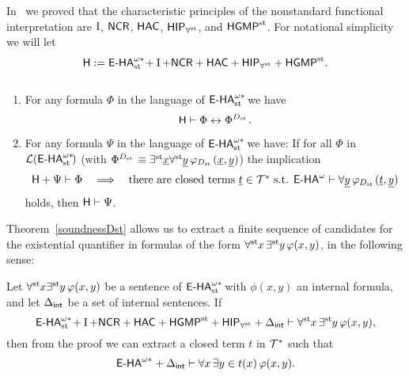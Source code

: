 In~\cite{BBS12} we proved that the characteristic principles of the nonstandard functional interpretation are $\I$, $\NCR$, $\HAC$, $\HIP_{\forallst}$, and $\HGMP$. For notational simplicity we will let
\[
     \HH := \ehaststar + \I + \NCR + \HAC + \HIP_{\forallst} + \HGMP.
\]
\begin{thm} $\, $

\begin{enumerate}

\item For any formula $\Phi$ in the language of $\ehaststar$ we have
\[
          \HH \vdash \Phi \leftrightarrow \Phi^{\D}.
\]
\item For any formula $\Psi$ in the language of $\ehaststar$ we have: If for all $\Phi$ in
$\mathcal{L}(\ehaststar)$ (with $\Phi^{\D}\equiv \existsst \tup{x}\forallst \tup{y}\, \phi_{\D}(\tup{x},\tup{y})$) the implication
\begin{equation}\label{eq:char_thm_dst}
          \HH +\Psi \vdash \Phi  \quad \Longrightarrow \quad \mbox{there are closed terms $\tup{t}\in\Tstar$ s.t. }
          \eha \vdash \forall \tup{y}\, \phi_{\D}(\tup{t},\tup{y})
\end{equation}
holds, then $\HH \vdash \Psi$.


\end{enumerate}
\end{thm}

Theorem~\ref{soundnessDst} allows us to extract a finite sequence of candidates for the existential quantifier in formulas of the form $\forallst x \, \existsst y \, \phi (x,y)$, in the following sense:

\begin{thm}
Let $\forallst x \existsst y \, \phi (x,y)$ be a sentence of $\ehaststar$ with $\phi(x,y)$ an internal formula,
and let $\Delta_{\intern}$ be a set of internal sentences.
If
\[
    \ehaststar + \I + \NCR + \HAC + \HGMP
    +  \HIP_{\forallst} + \Delta_{\intern} \vdash \forallst x \, \existsst y \, \phi (x,y),
\]
then from the proof we can extract a closed term $t$ in $\Tstar$ such that
\[
    \ehastar +\Delta_{\intern} \vdash \forall x \, \exists y \in t(x)\, \phi (x,y).
\]
\end{thm}

